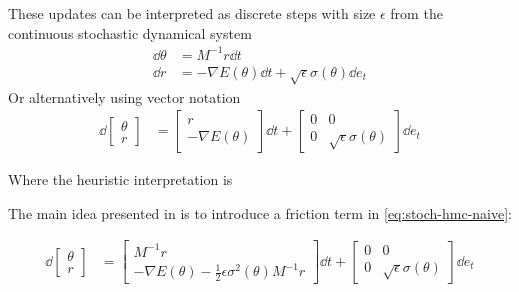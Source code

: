 These updates can be interpreted as discrete steps with size $\epsilon$ from the continuous stochastic dynamical system
\begin{align*}
    \dd{\theta} &= M^{-1} r\dd{t} \\
    \dd{r} &= -\nabla{E}(\theta)\dd{t}  + \sqrt{\epsilon}\sigma(\theta) \dd{e_t} 
\end{align*}
Or alternatively using vector notation
\begin{align} \label{eq:stoch-hmc-naive}
    \dd{\begin{bmatrix}\theta \\ r \end{bmatrix}} &= 
    \begin{bmatrix}
        r \\ -\nabla{E}(\theta) 
    \end{bmatrix} \dd{t} + \begin{bmatrix}
        0 & 0 \\ 
        0 & \sqrt{\epsilon}\sigma(\theta)
    \end{bmatrix} \dd{e_t}
\end{align}

Where the heuristic interpretation is 

The main idea presented in \cite{chen_stochastic_2014} is to introduce a friction term in \cref{eq:stoch-hmc-naive}:

\begin{align*}
    \dd{\begin{bmatrix}\theta \\ r \end{bmatrix}} &= 
    \begin{bmatrix}
        M^{-1}r \\ -\nabla{E}(\theta) - \frac{1}{2}\epsilon\sigma^2(\theta)M^{-1}r
    \end{bmatrix} \dd{t} + \begin{bmatrix}
        0 & 0 \\ 
        0 & \sqrt{\epsilon}\sigma(\theta)
    \end{bmatrix} \dd{e_t}
\end{align*}


